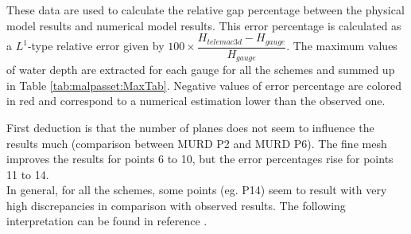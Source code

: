 These data are used to calculate the relative gap percentage between the physical model results and numerical model results. This error percentage is calculated as a $L^{1}$-type relative error given by $100 \times \dfrac{H_{telemac3d} - H_{gauge}}{H_{gauge}}$. The maximum values of water depth are extracted for each gauge for all the schemes and summed up in Table \ref{tab:malpasset:MaxTab}. Negative values of error percentage are colored in red and correspond to a numerical estimation lower than the observed one.
\begin{table}[H]
  \caption{Maximum values of water depth on measurement points for different schemes on the Malpasset case - relative errors.}
      \label{tab:malpasset:MaxTab}
\end{table}

First deduction is that the number of planes does not seem to influence the results much (comparison between MURD P2 and MURD P6). The fine mesh improves the results for points 6 to 10, but the error percentages rise for points 11 to 14. \\

In general, for all the schemes, some points (eg. P14) seem to result with very high discrepancies in comparison with observed results. The following interpretation can be found in reference \cite{Hervouet2007}. \\

